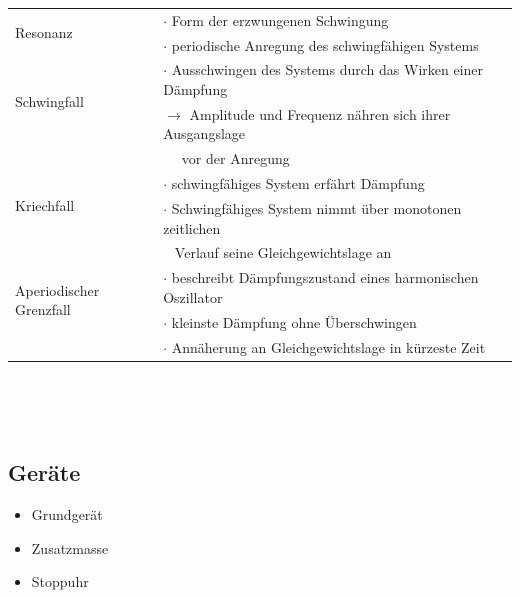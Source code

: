 \documentclass[a4paper,11pt]{scrartcl}
\begin{document}
\begin{tabularx}{\textwidth}{l|l}
		\multirow{2}{*}{Resonanz}&$\cdot$ Form der erzwungenen Schwingung\\
		&$\cdot$ periodische Anregung des schwingfähigen Systems\\
		\hline
		
		\multirow{2}{*}{Schwingfall}&$\cdot$ Ausschwingen des Systems durch das Wirken einer Dämpfung\\
		&$\rightarrow$ Amplitude und Frequenz nähren sich ihrer Ausgangslage\\
		&~~ vor der Anregung\\
		\hline
		
		\multirow{2}{*}{Kriechfall}&$\cdot$ schwingfähiges System erfährt Dämpfung\\
		&$\cdot$ Schwingfähiges System nimmt über monotonen zeitlichen\\
		&~ Verlauf seine Gleichgewichtslage an  \\
		\hline
		 
		\multirow{2}{*}{Aperiodischer Grenzfall}&$\cdot$ beschreibt Dämpfungszustand eines harmonischen Oszillator\\
		& $\cdot$ kleinste Dämpfung ohne Überschwingen\\
		& $\cdot$ Annäherung an Gleichgewichtslage in kürzeste Zeit 
	\end{tabularx}
	\par ~ \par ~
	\subsection*{Geräte} 
	\begin{itemize}
		\item Grundgerät
		\item Zusatzmasse
		\item Stoppuhr
	\end{itemize}
	\par ~ \par ~
	\newpage
\end{document}
